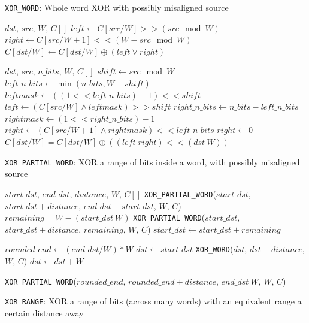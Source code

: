 \begin{algorithm}
\caption{\texttt{XOR\_WORD}: Whole word XOR with possibly misaligned source}
\label{alg:xor_word}
\begin{algorithmic}[1]
  \REQUIRE $dst$, $src$, $W$, $C[]$
  \STATE $left \gets C[src / W] >> (src \mod W)$
  \STATE $right \gets C[src / W + 1] << (W - src \mod W)$
  \STATE $C[dst / W] \gets C[dst / W] \oplus (left \lor right)$
\end{algorithmic}
\end{algorithm}

\begin{algorithm}
\begin{algorithmic}[1]
  \REQUIRE $dst$, $src$, $n\_bits$, $W$, $C[]$
  \STATE $shift \gets src \mod W$
  \STATE $left\_n\_bits \gets \min(n\_bits, W - shift)$
  \STATE $leftmask \gets ((1 << left\_n\_bits) - 1) << shift$
  \STATE $left \gets (C[src / W] \land leftmask) >> shift$
  \STATE $right\_n\_bits \gets n\_bits - left\_n\_bits$
    \STATE $rightmask \gets (1 << right\_n\_bits) - 1$
    \STATE $right \gets (C[src/W+1] \land rightmask) << left\_n\_bits$
  \ELSE
    \STATE $right \gets 0$
  \ENDIF
  \STATE $C[dst/W] = C[dst/W] \oplus ((left | right) << (dst \ W))$
  \caption{\texttt{XOR\_PARTIAL\_WORD}: XOR a range of bits inside a word, with possibly misaligned source}
  \label{alg:xor_partial_word}
\end{algorithmic}
\end{algorithm}

\begin{algorithm}
\begin{algorithmic}[1]
  \REQUIRE $start\_dst$, $end\_dst$, $distance$, $W$, $C[]$
    \STATE \texttt{XOR\_PARTIAL\_WORD}($start\_dst$, $start\_dst + distance$, $end\_dst - start\_dst$, $W$, $C$)
  \ELSE
      \STATE $remaining = W - (start\_dst \ W)$
      \STATE \texttt{XOR\_PARTIAL\_WORD}($start\_dst$, $start\_dst + distance$, $remaining$, $W$, $C$)
      \STATE $start\_dst \gets start\_dst + remaining$
    \ENDIF
    
    \STATE $rounded\_end \gets (end\_dst / W) * W$
    \STATE $dst \gets start\_dst$
      \STATE \texttt{XOR\_WORD}($dst$, $dst + distance$, $W$, $C$)
      \STATE $dst \gets dst + W$
    \ENDWHILE
    
      \STATE \texttt{XOR\_PARTIAL\_WORD}($rounded\_end$, $rounded\_end + distance$, $end\_dst \ W$, $W$, $C$)
    \ENDIF
  \ENDIF
  \label{alg:xor_range}
  \caption{\texttt{XOR\_RANGE}: XOR a range of bits (across many words) with an equivalent range a certain distance away}
\end{algorithmic}
\end{algorithm}

